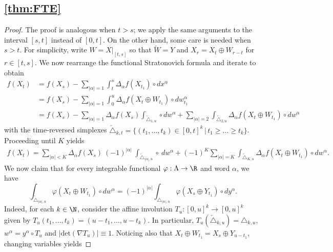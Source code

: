 \subsection{\cref{thm:FTE}}
\label{app:FTE}

\begin{proof} The proof is analogous   when $t>s$; we  apply the same arguments  to the interval $[s,t]$ instead of $[0,t]$. On the other hand, some care is needed when $s>t$. For simplicity, write $W =X|_{[t,s]}$ so that  $\overleftarrow{W}=Y$ and $X_r = X_t \oplus W_{r-t}$ for $r\in [t,s]$. We now rearrange the functional Stratonovich formula and  iterate to obtain
\begin{align*}
    f(X_t) 
    &= f(X_s) - \sum_{|\alpha|=1}\int_t^s \Delta_{\alpha} f(X_{t_1}) \circ  dx^{\alpha}\\ 
    &= f(X_s) - \sum_{|\alpha|=1}\int_{0}^{u} \Delta_{\alpha} f(X_{t} \oplus W_{\! t_1}) \circ  dw_{t_1}^{\alpha}\\ 
    &= f(X_s) - \sum_{|\alpha|=1}\Delta_{\alpha} f(X_s) \int_{\overleftarrow{\triangle}_{1,u} } \circ  dw^{\alpha} + \sum_{|\alpha|=2}\int_{\overleftarrow{\triangle}_{2,u} }  \Delta_{\alpha} f(X_t \oplus W_{t_1})  \circ  dw^{\alpha}
\end{align*}
with the time-reversed simplexes $\overleftarrow{\triangle}_{k,t}=  \{(t_1,\ldots,t_k)\in [0,t]^k\,|\, t_1 \ge \ldots \ge t_k\}$. %
Proceeding until $K$ yields 
\begin{align}\label{eq:intermediate}
    f(X_t) =  \sum_{|\alpha|<K} \Delta_{\alpha} f(X_{s}) \ (-1)^{|\alpha|} \ \int_{\overleftarrow{\triangle}_{|\alpha|,u} }   \circ \ dw^{\alpha} + (-1)^K \sum_{|\alpha|=K}  \int_{\overleftarrow{\triangle}_{K,u} }  \Delta_{\alpha} f(X_t \oplus W_{t_1})  \circ  dw^{\alpha}.
\end{align}
We now claim that for every integrable functional $\varphi:\Lambda \to \R$ and word $\alpha$, we have 
\begin{equation}\label{eq:claim}
    \int_{\overleftarrow{\triangle}_{|\alpha|,u} } \varphi(X_t \oplus W_{t_1})  \circ  dw^{\alpha} = (-1)^{|\alpha|}  \int_{\triangle_{|\alpha|,u} } \varphi(X_s \oplus Y_{t_1})  \circ  dy^{\alpha}. 
\end{equation}
Indeed, for each $k \in \N$,  consider the affine involution $T_u:[0,u]^k \to [0,u]^k$ given by $T_u(t_1,\ldots, t_k) = (u-t_1,\ldots,u-t_k)$. In particular,  $T_u(\overleftarrow{\triangle}_{k,u}) = \triangle_{k,u}$,  $w^{\alpha}= y^{\alpha} \circ T_u $ and $|\text{det}(\nabla T_u)| \equiv 1$.  Noticing also that $X_t \oplus W_{t_1} = X_s \oplus Y_{u-t_1}$, changing variables yields 

\end{proof}
